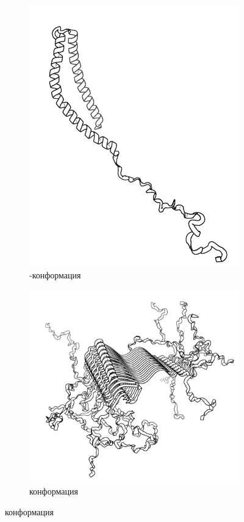 \begin{figure}[h]
	\centering
	\begin{subfigure}[t]{0.39\linewidth}
		\includegraphics[width = \textwidth]{pics/alpha_struct.png}
		\caption{-конформация}\label{fig:alpha}
	\end{subfigure}
	\begin{subfigure}[t]{0.6\textwidth}
		\includegraphics[width = \textwidth]{pics/beta_struct.png}
		\caption{конформация}\label{fig:beta}


\end{subfigure}
\end{figure}
